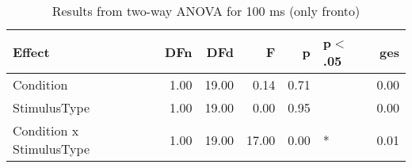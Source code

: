 \begin{table}[ht]
\centering
\begin{tabulary}{\textwidth}{lrrrrlr}
  \toprule
Effect & DFn & DFd & F & p & p$<$.05 & ges \\ 
  \midrule
Condition & 1.00 & 19.00 & 0.14 & 0.71 &  & 0.00 \\ 
  StimulusType & 1.00 & 19.00 & 0.00 & 0.95 &  & 0.00 \\ 
  Condition x StimulusType & 1.00 & 19.00 & 17.00 & 0.00 & * & 0.01 \\ 
   \bottomrule
\end{tabulary}
\caption{Results from two-way ANOVA for 100 ms (only fronto)} 
\end{table}
